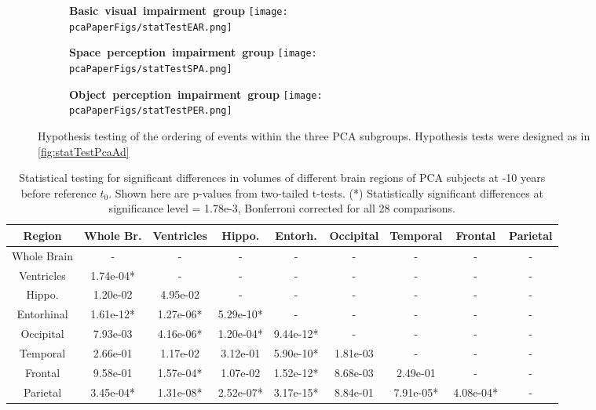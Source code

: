 \begin{figure}
\centering
  \begin{subfigure}[t]{0.48\textwidth}
  \centering
 \textbf{\large{\mbox{Basic visual impairment group}}}
    \texttt{[image: \\pcaPaperFigs/statTestEAR.png]}
 \end{subfigure}
 
  \begin{subfigure}[t]{0.48\textwidth}
  \centering
 \textbf{\large{\mbox{Space perception impairment group}}}
 \texttt{[image: \\pcaPaperFigs/statTestSPA.png]}
 \end{subfigure}

\begin{subfigure}[t]{0.48\textwidth}
\centering
   \textbf{\large{\mbox{Object perception impairment group}}}
 \texttt{[image: \\pcaPaperFigs/statTestPER.png]}
 \end{subfigure}
 \caption[Hypothesis testing of the ordering of events within the three PCA subgroups.]{Hypothesis testing of the ordering of events within the three PCA subgroups. Hypothesis tests were designed as in \ref{fig:statTestPcaAd}}
\label{fig:statTestEarSpaPer}
\end{figure}

\FloatBarrier



\begin{table}
\centering
\begin{tabular}{c |c c c c c c c c }
Region & Whole Br. & Ventricles & Hippo. & Entorh. & Occipital & Temporal & Frontal & Parietal\\
\hline 
Whole Brain & - & - & - & - & - & - & - & -\\
Ventricles & 1.74e-04* & - & - & - & - & - & - & -\\
Hippo. & 1.20e-02 & 4.95e-02 & - & - & - & - & - & -\\
Entorhinal & 1.61e-12* & 1.27e-06* & 5.29e-10* & - & - & - & - & -\\
Occipital & 7.93e-03 & 4.16e-06* & 1.20e-04* & 9.44e-12* & - & - & - & -\\
Temporal & 2.66e-01 & 1.17e-02 & 3.12e-01 & 5.90e-10* & 1.81e-03 & - & - & -\\
Frontal & 9.58e-01 & 1.57e-04* & 1.07e-02 & 1.52e-12* & 8.68e-03 & 2.49e-01 & - & -\\
Parietal & 3.45e-04* & 1.31e-08* & 2.52e-07* & 3.17e-15* & 8.84e-01 & 7.91e-05* & 4.08e-04* & -\\
\end{tabular} 
\caption[Statistical testing for significant differences in volumes of different brain regions of PCA subjects at -10 years before$t_0$]{Statistical testing for significant differences in volumes of different brain regions of PCA subjects at -10 years before reference $t_0$. Shown here are p-values from two-tailed t-tests. (*) Statistically significant differences at significance level = 1.78e-3, Bonferroni corrected for all 28 comparisons. } 
\label{tab:demStatTestVolsPcaMinus10}
\end{table}




